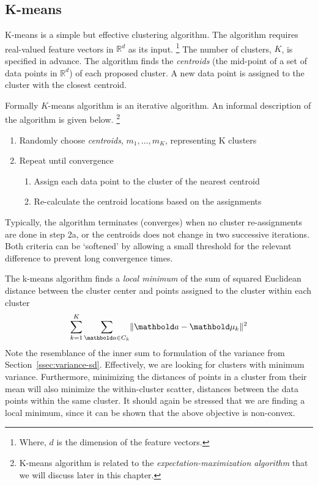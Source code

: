 \subsection{K-means}

K-means is a simple but effective  clustering algorithm.
The algorithm requires real-valued feature vectors in $\mathbb{R}^d$
as its input.%
\footnote{Where, $d$ is the dimension of the feature vectors.}
The number of clusters, $K$, is specified in advance.
The algorithm finds the \emph{centroids}
(the mid-point of a set of data points in $\mathbb{R}^d$)
of each proposed cluster.
A new data point is assigned to the cluster with the closest centroid.

Formally $K$-means algorithm is an iterative algorithm.
An informal description of the algorithm is given below.%
\footnote{K-means algorithm is related to
  the \emph{expectation-maximization algorithm} that we will discuss
  later in this chapter.
}

\begin{enumerate}
  \item Randomly choose \emph{centroids}, $m_{1}, \ldots, m_{K}$,
    representing K clusters
  \item Repeat until convergence
    \begin{enumerate}
      \item Assign each data point to the cluster of the nearest centroid
      \item Re-calculate the centroid locations based on the assignments
    \end{enumerate}
\end{enumerate}

Typically, the algorithm terminates (converges) 
when no cluster re-assignments are done in step 2a,
or the centroids does not change in two successive iterations.
Both criteria can be `softened'
by allowing a small threshold for the relevant difference
to prevent long convergence times.

The k-means algorithm finds a \emph{local minimum} of the sum of
squared Euclidean distance
between the cluster center and points assigned to the cluster
within each cluster
\begin{equation}\label{eq:k-means-obj}
  \sum_{k=1}^{K} \sum_{\vect{a} \in C_{k}} \norm{\vect{a} - \vect{\mu}_{k}}^{2}
\end{equation}
Note the resemblance of the inner sum to formulation of the variance
from Section~\ref{ssec:variance-sd}.
Effectively, we are looking for clusters with minimum variance.
Furthermore, minimizing the distances of points in a cluster
from their mean will also minimize the within-cluster scatter,
distances between the data points within the same cluster.
It should again be stressed that we are finding a local minimum,
since it can be shown that the above objective is non-convex.

